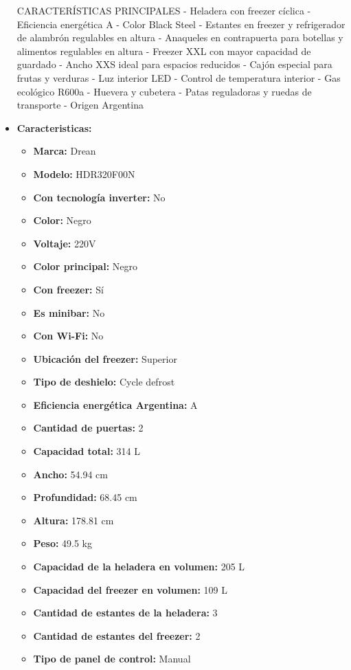 \documentclass{article}
\begin{document}
\begin{adjustwidth}{2em}{}
\begin{itemize}
CARACTERÍSTICAS PRINCIPALES
- Heladera con freezer cíclica
- Eficiencia energética A
- Color Black Steel
- Estantes en freezer y refrigerador de alambrón regulables en altura
- Anaqueles en contrapuerta para botellas y alimentos regulables en altura
- Freezer XXL con mayor capacidad de guardado
- Ancho XXS ideal para espacios reducidos
- Cajón especial para frutas y verduras
- Luz interior LED
- Control de temperatura interior
- Gas ecológico R600a
- Huevera y cubetera
- Patas reguladoras y ruedas de transporte
- Origen Argentina
        \item \textbf{Caracteristicas:} 
        \begin{itemize}
            \item \textbf {Marca:} Drean
    \item \textbf {Modelo:} HDR320F00N
    \item \textbf {Con tecnología inverter:} No
    \item \textbf {Color:} Negro
    \item \textbf {Voltaje:} 220V
    \item \textbf {Color principal:} Negro
    \item \textbf {Con freezer:} Sí
    \item \textbf {Es minibar:} No
    \item \textbf {Con Wi-Fi:} No
    \item \textbf {Ubicación del freezer:} Superior
    \item \textbf {Tipo de deshielo:} Cycle defrost
    \item \textbf {Eficiencia energética Argentina:} A
    \item \textbf {Cantidad de puertas:} 2
    \item \textbf {Capacidad total:} 314 L
    \item \textbf {Ancho:} 54.94 cm
    \item \textbf {Profundidad:} 68.45 cm
    \item \textbf {Altura:} 178.81 cm
    \item \textbf {Peso:} 49.5 kg
    \item \textbf {Capacidad de la heladera en volumen:} 205 L
    \item \textbf {Capacidad del freezer en volumen:} 109 L
    \item \textbf {Cantidad de estantes de la heladera:} 3
    \item \textbf {Cantidad de estantes del freezer:} 2
    \item \textbf {Tipo de panel de control:} Manual

\end{itemize}
\end{itemize}
\end{adjustwidth}
\end{document}
